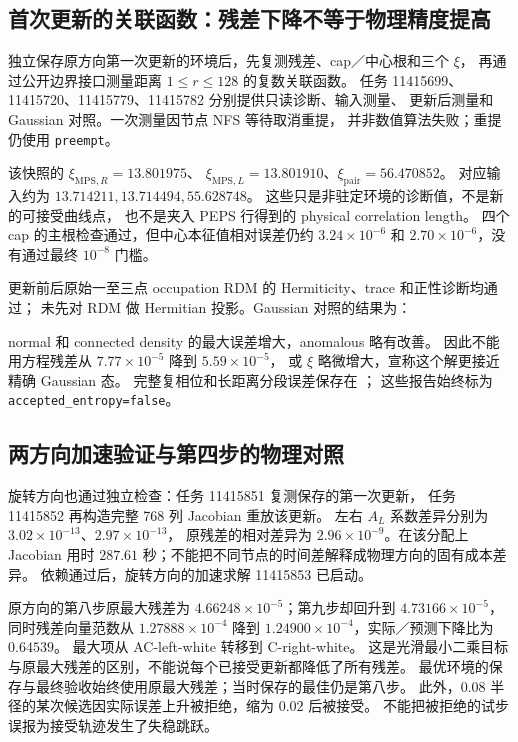 \documentclass[11pt]{article}
\newcommand{\code}[1]{{\small\texttt{#1}}}
\begin{document}
\subsection{首次更新的关联函数：残差下降不等于物理精度提高}
独立保存原方向第一次更新的环境后，先复测残差、cap／中心根和三个 $\xi$，
再通过公开边界接口测量距离 $1\leq r\leq128$ 的复数关联函数。
任务 11415699、11415720、11415779、11415782 分别提供只读诊断、输入测量、
更新后测量和 Gaussian 对照。一次测量因节点 NFS 等待取消重提，
并非数值算法失败；重提仍使用 \code{preempt}。

该快照的 $\xi_{\mathrm{MPS},R}=13.801975$、
$\xi_{\mathrm{MPS},L}=13.801910$、$\xi_{\mathrm{pair}}=56.470852$。
对应输入约为 $13.714211,13.714494,55.628748$。
这些只是非驻定环境的诊断值，不是新的可接受曲线点，
也不是夹入 PEPS 行得到的 physical correlation length。
四个 cap 的主根检查通过，但中心本征值相对误差仍约
$3.24\times10^{-6}$ 和 $2.70\times10^{-6}$，没有通过最终 $10^{-8}$ 门槛。

更新前后原始一至三点 occupation RDM 的 Hermiticity、trace 和正性诊断均通过；
未先对 RDM 做 Hermitian 投影。Gaussian 对照的结果为：
\begin{center}\small

\end{center}
normal 和 connected density 的最大误差增大，anomalous 略有改善。
因此不能用方程残差从 $7.77\times10^{-5}$ 降到 $5.59\times10^{-5}$，
或 $\xi$ 略微增大，宣称这个解更接近精确 Gaussian 态。
完整复相位和长距离分段误差保存在
；
这些报告始终标为 \code{accepted\_entropy=false}。

\subsection{两方向加速验证与第四步的物理对照}
旋转方向也通过独立检查：任务 11415851 复测保存的第一次更新，
任务 11415852 再构造完整 768 列 Jacobian 重放该更新。
左右 $A_L$ 系数差异分别为 $3.02\times10^{-13}$、$2.97\times10^{-13}$，
原残差的相对差异为 $2.96\times10^{-9}$。在该分配上 Jacobian 用时
$287.61$ 秒；不能把不同节点的时间差解释成物理方向的固有成本差异。
依赖通过后，旋转方向的加速求解 11415853 已启动。

原方向的第八步原最大残差为 $4.66248\times10^{-5}$；第九步却回升到
$4.73166\times10^{-5}$，同时残差向量范数从 $1.27888\times10^{-4}$
降到 $1.24900\times10^{-4}$，实际／预测下降比为 $0.64539$。
最大项从 AC-left-white 转移到 C-right-white。
这是光滑最小二乘目标与原最大残差的区别，不能说每个已接受更新都降低了所有残差。
最优环境的保存与最终验收始终使用原最大残差；当时保存的最佳仍是第八步。
此外，$0.08$ 半径的某次候选因实际误差上升被拒绝，缩为 $0.02$ 后被接受。
不能把被拒绝的试步误报为接受轨迹发生了失稳跳跃。
\end{document}
